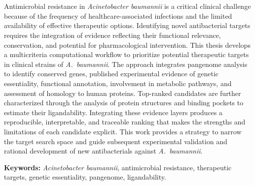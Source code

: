 \chapter*{\runtitle}

\noindent Antimicrobial resistance in \textit{Acinetobacter baumannii} is a critical clinical challenge because of the frequency of healthcare-associated infections and the limited availability of effective therapeutic options. Identifying novel antibacterial targets requires the integration of evidence reflecting their functional relevance, conservation, and potential for pharmacological intervention. This thesis develops a multicriteria computational workflow to prioritize potential therapeutic targets in clinical strains of \textit{A.~baumannii}. The approach integrates pangenome analysis to identify conserved genes, published experimental evidence of genetic essentiality, functional annotation, involvement in metabolic pathways, and assessment of homology to human proteins. Top-ranked candidates are further characterized through the analysis of protein structures and binding pockets to estimate their ligandability. Integrating these evidence layers produces a reproducible, interpretable, and traceable ranking that makes the strengths and limitations of each candidate explicit. This work provides a strategy to narrow the target search space and guide subsequent experimental validation and rational development of new antibacterials against \textit{A.~baumannii}.

\bigskip

\noindent\textbf{Keywords:} \textit{Acinetobacter baumannii}, antimicrobial resistance, therapeutic targets, genetic essentiality, pangenome, ligandability.
